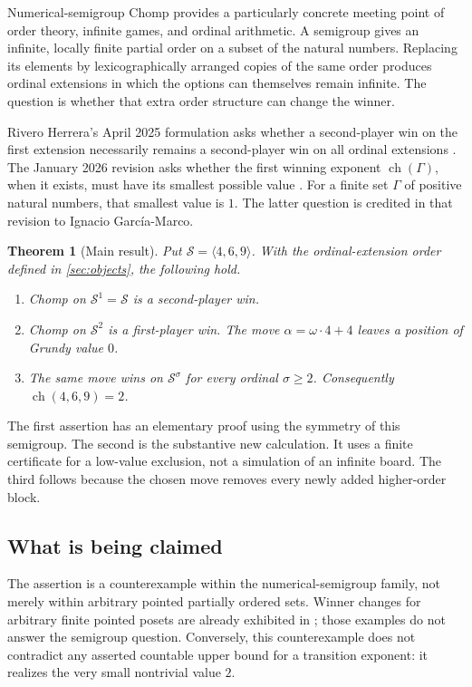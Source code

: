 \documentclass[11pt,letterpaper]{article}
\numberwithin{equation}{section}
\newtheorem{theorem}{Theorem}[section]
\theoremstyle{definition}
\newcommand{\Sg}{\mathcal S}
\newcommand{\ch}{\operatorname{ch}}
\begin{document}
Numerical-semigroup Chomp provides a particularly concrete meeting point of
order theory, infinite games, and ordinal arithmetic. A semigroup gives an
infinite, locally finite partial order on a subset of the natural numbers.
Replacing its elements by lexicographically arranged copies of the same
order produces ordinal extensions in which the options can themselves remain
infinite. The question is whether that extra order structure can change the
winner.

Rivero Herrera's April 2025 formulation asks whether a second-player win on
the first extension necessarily remains a second-player win on all ordinal
extensions \cite[Conjecture~4.1]{RiveroV1}. The January 2026 revision asks
whether the first winning exponent $\ch(\Gamma)$, when it exists, must have
its smallest possible value \cite[Question~4.6]{RiveroV3}. For a finite set
$\Gamma$ of positive natural numbers, that smallest value is $1$.
The latter question is credited in that revision to Ignacio Garc\'ia-Marco.

\begin{theorem}[Main result]\label{thm:main}
Put $\Sg=\langle4,6,9\rangle$. With the ordinal-extension order defined in
\cref{sec:objects}, the following hold.
\begin{enumerate}[label=\textup{(\roman*)}]
\item Chomp on $\Sg^1=\Sg$ is a second-player win.
\item Chomp on $\Sg^2$ is a first-player win. The move
      $\alpha=\omega\cdot4+4$ leaves a position of Grundy value $0$.
\item The same move wins on $\Sg^\sigma$ for every ordinal $\sigma\geq2$.
      Consequently $\ch(4,6,9)=2$.
\end{enumerate}
\end{theorem}

The first assertion has an elementary proof using the symmetry of this
semigroup. The second is the substantive new calculation. It uses a finite
certificate for a low-value exclusion, not a simulation of an infinite
board. The third follows because the chosen move removes every newly added
higher-order block.

\subsection{What is being claimed}

The assertion is a counterexample within the numerical-semigroup family,
not merely within arbitrary pointed partially ordered sets. Winner changes
for arbitrary finite pointed posets are already exhibited in
\cite[Example~3.2]{RiveroV3}; those examples do not answer the semigroup
question. Conversely, this counterexample does not contradict any asserted
countable upper bound for a transition exponent: it realizes the very small
nontrivial value $2$.
\end{document}
